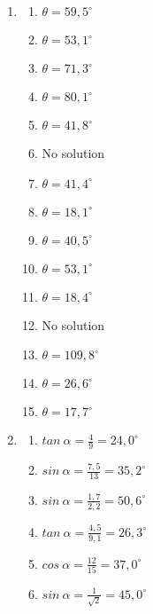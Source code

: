  \begin{solutions}{}{
\begin{enumerate}[itemsep=5pt, label=\textbf{\arabic*}. ] 


\item 
\begin{multicols}{2}
    \begin{enumerate}[noitemsep, label=\textbf{(\alph*)} ]
\item $\theta = 59,5^{\circ}$%
\item $\theta =53,1^{\circ}$%
\item $\theta =71,3^{\circ}$%
\item $\theta =80,1^{\circ}$%
\item $\theta =41,8^{\circ}$%
\item No solution%
\item $\theta =41,4^{\circ}$%
\item $\theta =18,1^{\circ}$%
\item $\theta =40,5^{\circ}$%
\item $\theta =53,1^{\circ}$%
\item $\theta =18,4^{\circ}$%
\item No solution%
\item $\theta =109,8^{\circ}$%
\item $\theta =26,6^{\circ}$%
\item $\theta =17,7^{\circ}$%
\end{enumerate}
\end{multicols}
\item 
\begin{multicols}{2}
    \begin{enumerate}[noitemsep, label=\textbf{(\alph*)} ]
\item $tan~ \alpha = \frac{4}{9}=24,0^{\circ}$
\item $sin~\alpha = \frac{7,5}{13}=35,2^{\circ}$
\item $sin~\alpha= \frac{1,7}{2,2}=50,6^{\circ}$
\item $tan~\alpha=\frac{4,5}{9,1}=26,3^{\circ}$
\item $cos~\alpha=\frac{12}{15}=37,0^{\circ}$
\item $sin~\alpha=\frac{1}{\sqrt{2}}=45,0^{\circ}$
      \end{enumerate}
\end{multicols}
\end{enumerate}}
\end{solutions}


